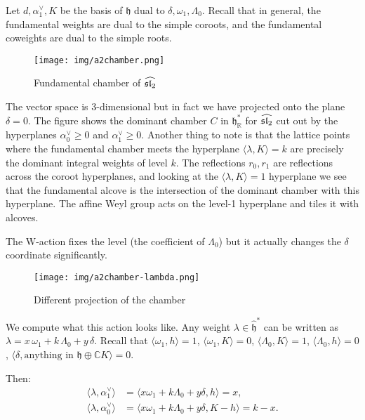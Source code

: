 \documentclass[12pt]{article}
\begin{document}
\begin{example}
     Let $d, \alpha_1^\vee, K$ be the basis of $\mathfrak{h}$ dual to $\delta, \omega_1, \Lambda_0$. Recall that in general, the fundamental weights are dual to the simple coroots, and the fundamental coweights are dual to the simple roots.
    \begin{figure}[H]
        \centering
        \texttt{[image: img/a2chamber.png]}
        \caption{Fundamental chamber of $\widehat{\sl_2}$}
    \end{figure}
    The vector space is $3$-dimensional but in fact we have projected onto the plane $\delta = 0$. The figure shows the dominant chamber $C$ in $\mathfrak{h}^*_\mathbb{R}$ for $\widehat{\sl_2}$ cut out by the hyperplanes $\alpha_0^\vee \geq 0$ and $\alpha_1^\vee \geq 0$. Another thing to note is that the lattice points where the fundamental chamber meets the hyperplane $\langle \lambda, K \rangle = k$ are precisely the dominant integral weights of level $k$. The reflections $r_0, r_1$ are reflections across the coroot hyperplanes, and looking at the $\langle \lambda, K \rangle = 1$ hyperplane we see that the fundamental alcove is the intersection of the dominant chamber with this hyperplane. The affine Weyl group acts on the level-1 hyperplane and tiles it with alcoves.

    The W-action fixes the level (the coefficient of $\Lambda_0$) but it actually changes the $\delta$ coordinate significantly.
    \begin{figure}[H]
        \centering
        \texttt{[image: img/a2chamber-lambda.png]}
        \caption{Different projection of the chamber}
    \end{figure}
\end{example}
We compute what this action looks like. Any weight $\lambda\in \widehat{\mathfrak h}^*$ can be written as
$\lambda = x\,\omega_1 + k\,\Lambda_0 + y\,\delta$. Recall that
$\langle \omega_1, h \rangle = 1$, $\langle \omega_1, K \rangle = 0$,
$\langle \Lambda_0, K \rangle = 1$, $\langle \Lambda_0, h \rangle = 0$,
$\langle \delta, \text{anything in } \mathfrak h \oplus \mathbb{C}K \rangle = 0$.

Then:
\[\begin{aligned}
        \langle \lambda, \alpha_1^\vee\rangle & = \langle x\omega_1 + k\Lambda_0 + y\delta, h\rangle = x,       \\
        \langle \lambda, \alpha_0^\vee\rangle & = \langle x\omega_1 + k\Lambda_0 + y\delta, K-h\rangle = k - x.
    \end{aligned}\]
\end{document}
